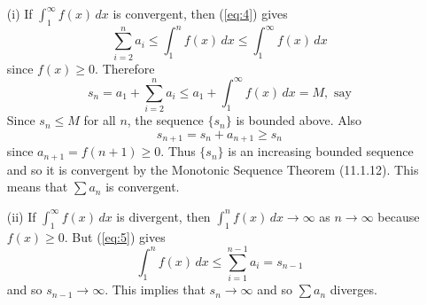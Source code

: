 \documentclass{article}
\theoremstyle{mystyle}
\begin{document}
\begin{itemize}
    \item[(i)] If \( \int_1^\infty f(x) \,dx \) is convergent, then (\ref{eq:4}) gives
    \[ \sum_{i=2}^{n} a_i \le \int_1^n f(x) \,dx \le \int_1^\infty f(x) \,dx \]
    since \( f(x) \ge 0 \). Therefore
    \[ s_n = a_1 + \sum_{i=2}^{n} a_i \le a_1 + \int_1^\infty f(x) \,dx = M, \text{ say} \]
    Since \( s_n \le M \) for all \( n \), the sequence \( \{s_n\} \) is bounded above. Also
    \[ s_{n+1} = s_n + a_{n+1} \ge s_n \]
    since \( a_{n+1} = f(n+1) \ge 0 \). Thus \( \{s_n\} \) is an increasing bounded sequence and so it is convergent by the Monotonic Sequence Theorem (11.1.12). This means that \( \sum a_n \) is convergent.
    
    \item[(ii)] If \( \int_1^\infty f(x) \,dx \) is divergent, then \( \int_1^n f(x) \,dx \to \infty \) as \( n \to \infty \) because \( f(x) \ge 0 \). But (\ref{eq:5}) gives
    \[ \int_1^n f(x) \,dx \le \sum_{i=1}^{n-1} a_i = s_{n-1} \]
    and so \( s_{n-1} \to \infty \). This implies that \( s_n \to \infty \) and so \( \sum a_n \) diverges.
\end{itemize}
\end{document}
